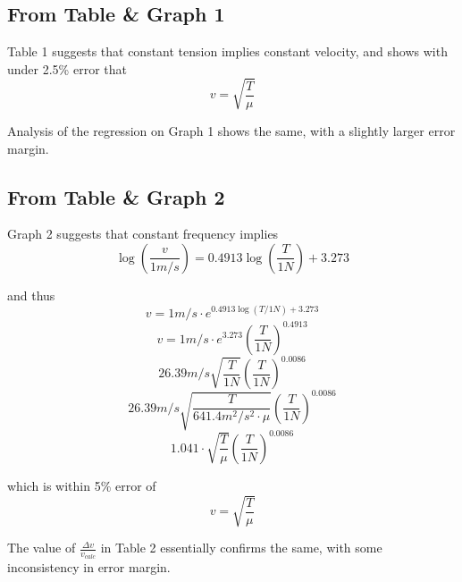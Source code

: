 \documentclass{article}
\begin{document}
\subsection{From Table \& Graph 1}

Table 1 suggests that constant tension implies constant velocity, and shows with under 2.5\% error that 
$$v = \sqrt{\frac{T}{\mu}}$$

Analysis of the regression on Graph 1 shows the same, with a slightly larger error margin.



\subsection{From Table \& Graph 2}










Graph 2 suggests that constant frequency implies
$$\log(\frac{v}{1\si{m/s}}) = 0.4913 \log(\frac{T}{1\si{N}}) + 3.273$$

and thus
$$v = 1\si{m/s} \cdot e^{{0.4913} \log(T/1\si{N}) + 3.273}$$
$$v = 1\si{m/s} \cdot e^{3.273} (\frac{T}{1\si{N}})^{0.4913}$$
$$26.39\si{m/s} \sqrt{\frac{T}{1\si{N}}} (\frac{T}{1\si{N}})^{0.0086}$$
$$26.39\si{m/s} \sqrt{\frac{T}{641.4\si{m^2/s^2} \cdot \mu}} (\frac{T}{1\si{N}})^{0.0086}$$
$$1.041 \cdot \sqrt{\frac{T}{\mu}} (\frac{T}{1\si{N}})^{0.0086}$$

which is within 5\% error of
$$v = \sqrt{\frac{T}{\mu}}$$

The value of $\frac{\Delta v}{v_{calc}}$ in Table 2 essentially confirms the same, with some inconsistency in error margin.
\end{document}

